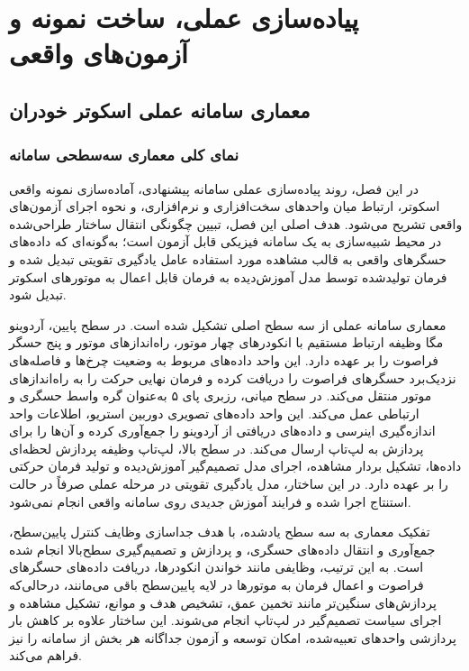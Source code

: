 \chapter{پیاده‌سازی عملی، ساخت نمونه و آزمون‌های واقعی}

\section{معماری سامانه عملی اسکوتر خودران}
\label{sec:real_scooter_architecture}

\subsection{نمای کلی معماری سه‌سطحی سامانه}

در این فصل، روند پیاده‌سازی عملی سامانه پیشنهادی، آماده‌سازی نمونه واقعی اسکوتر، ارتباط میان واحدهای سخت‌افزاری و نرم‌افزاری، و نحوه اجرای آزمون‌های واقعی تشریح می‌شود. هدف اصلی این فصل، تبیین چگونگی انتقال ساختار طراحی‌شده در محیط شبیه‌سازی به یک سامانه فیزیکی قابل آزمون است؛ به‌گونه‌ای که داده‌های حسگرهای واقعی به قالب مشاهده مورد استفاده عامل یادگیری تقویتی تبدیل شده و فرمان تولیدشده توسط مدل آموزش‌دیده به فرمان قابل اعمال به موتورهای اسکوتر تبدیل شود.

معماری سامانه عملی از سه سطح اصلی تشکیل شده است. در سطح پایین، آردوینو مگا وظیفه ارتباط مستقیم با انکودرهای چهار موتور، راه‌اندازهای موتور و پنج حسگر فراصوت را بر عهده دارد. این واحد داده‌های مربوط به وضعیت چرخ‌ها و فاصله‌های نزدیک‌برد حسگرهای فراصوت را دریافت کرده و فرمان نهایی حرکت را به راه‌اندازهای موتور منتقل می‌کند. در سطح میانی، رزبری پای ۵ به‌عنوان گره واسط حسگری و ارتباطی عمل می‌کند. این واحد داده‌های تصویری دوربین استریو، اطلاعات واحد اندازه‌گیری اینرسی و داده‌های دریافتی از آردوینو را جمع‌آوری کرده و آن‌ها را برای پردازش به لپ‌تاپ ارسال می‌کند. در سطح بالا، لپ‌تاپ وظیفه پردازش لحظه‌ای داده‌ها، تشکیل بردار مشاهده، اجرای مدل تصمیم‌گیر آموزش‌دیده و تولید فرمان حرکتی را بر عهده دارد. در این ساختار، مدل یادگیری تقویتی در مرحله عملی صرفاً در حالت استنتاج اجرا شده و فرایند آموزش جدیدی روی سامانه واقعی انجام نمی‌شود.

تفکیک معماری به سه سطح یادشده، با هدف جداسازی وظایف کنترل پایین‌سطح، جمع‌آوری و انتقال داده‌های حسگری، و پردازش و تصمیم‌گیری سطح‌بالا انجام شده است. به این ترتیب، وظایفی مانند خواندن انکودرها، دریافت داده‌های حسگرهای فراصوت و اعمال فرمان به موتورها در لایه پایین‌سطح باقی می‌مانند، درحالی‌که پردازش‌های سنگین‌تر مانند تخمین عمق، تشخیص هدف و موانع، تشکیل مشاهده و اجرای سیاست تصمیم‌گیر در لپ‌تاپ انجام می‌شوند. این ساختار علاوه بر کاهش بار پردازشی واحدهای تعبیه‌شده، امکان توسعه و آزمون جداگانه هر بخش از سامانه را نیز فراهم می‌کند.

